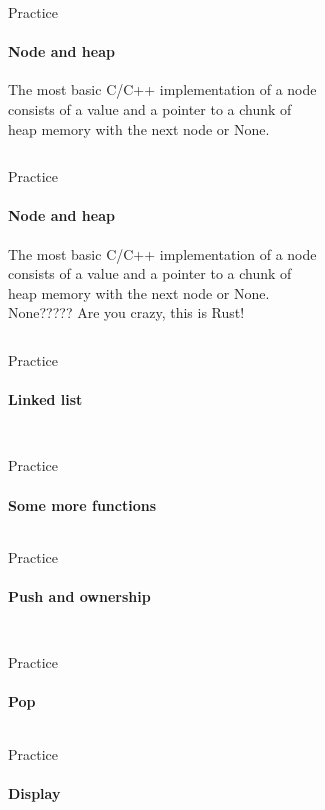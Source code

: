 \documentclass[usenames,dvipsnames,10pt,aspectratio=169]{beamer}
\begin{document}
\begin{frame}{Practice}
\framesubtitle{Node and heap}
\large
The most basic C/C++ implementation of a node\\
consists of a value and a pointer to a chunk of\\
heap memory with the next node or None.
\vspace{0.2cm}
\inputminted[fontsize=\large]{rust}{code/list1.rs}
\end{frame}

\begin{frame}{Practice}
\framesubtitle{Node and heap}
\large
The most basic C/C++ implementation of a node\\
consists of a value and a pointer to a chunk of\\
heap memory with the next node or None.\\
\vspace{0.2cm}
\textcolor{ucuyellow}{None????? Are you crazy, this is Rust!}
\vspace{0.2cm}
\inputminted[fontsize=\large]{rust}{code/list2.rs}
\end{frame}

\begin{frame}{Practice}
\framesubtitle{Linked list}
\inputminted[fontsize=\normalsize]{rust}{code/list3.rs}
\vspace{0.5cm}
\inputminted[fontsize=\normalsize]{rust}{code/list4.rs}
\vspace{0.5cm}
\end{frame}

\begin{frame}{Practice}
\framesubtitle{Some more functions}
\inputminted[fontsize=\large]{rust}{code/list5.rs}
\end{frame}

\begin{frame}{Practice}
	\framesubtitle{Push and ownership}
\inputminted[fontsize=\normalsize]{rust}{code/list6.rs}
\vspace{0.5cm}
\inputminted[fontsize=\normalsize]{rust}{code/list7.rs}
\end{frame}

\begin{frame}{Practice}
	\framesubtitle{Pop}
\inputminted[fontsize=\large]{rust}{code/list8.rs}
\end{frame}

\begin{frame}{Practice}
	\framesubtitle{Display}
\inputminted[fontsize=\normalsize]{rust}{code/list9.rs}
\end{frame}
\end{document}
